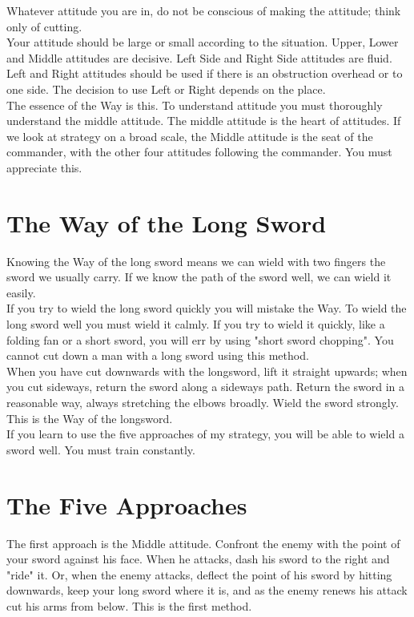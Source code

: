 Whatever attitude you are in, do not be conscious of making the attitude; think only of cutting.\\

Your attitude should be large or small according to the situation. Upper, Lower and Middle attitudes are decisive. Left Side and Right Side attitudes are fluid. Left and Right attitudes should be used if there is an obstruction overhead or to one side. The decision to use Left or Right depends on the place.\\

The essence of the Way is this. To understand attitude you must thoroughly understand the middle attitude. The middle attitude is the heart of attitudes. If we look at strategy on a broad scale, the Middle attitude is the seat of the commander, with the other four attitudes following the commander. You must appreciate this.\\
\section{The Way of the Long Sword}

Knowing the Way of the long sword means we can wield with two fingers the sword we usually carry. If we know the path of the sword well, we can wield it easily.\\

If you try to wield the long sword quickly you will mistake the Way. To wield the long sword well you must wield it calmly. If you try to wield it quickly, like a folding fan or a short sword, you will err by using "short sword chopping". You cannot cut down a man with a long sword using this method.\\

When you have cut downwards with the longsword, lift it straight upwards; when you cut sideways, return the sword along a sideways path. Return the sword in a reasonable way, always stretching the elbows broadly. Wield the sword strongly. This is the Way of the longsword.\\

If you learn to use the five approaches of my strategy, you will be able to wield a sword well. You must train constantly.\\
\section{The Five Approaches}

    The first approach is the Middle attitude. Confront the enemy with the point of your sword against his face. When he attacks, dash his sword to the right and "ride" it. Or, when the enemy attacks, deflect the point of his sword by hitting downwards, keep your long sword where it is, and as the enemy renews his attack cut his arms from below. This is the first method. \\

